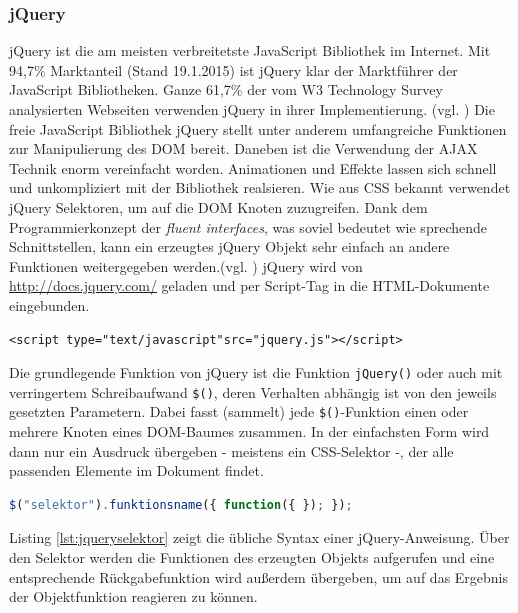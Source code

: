 \subsubsection{jQuery}
jQuery ist die am meisten verbreitetste JavaScript Bibliothek im Internet. Mit 94,7\% Marktanteil (Stand 19.1.2015) ist jQuery klar der Marktführer der JavaScript Bibliotheken. Ganze 61,7\% der vom W3 Technology Survey analysierten Webseiten verwenden jQuery in ihrer Implementierung. (vgl. \cite{w3tech}) Die freie JavaScript Bibliothek jQuery stellt unter anderem umfangreiche Funktionen zur Manipulierung des DOM bereit. Daneben ist die Verwendung der AJAX Technik enorm vereinfacht worden. Animationen und Effekte lassen sich schnell und unkompliziert mit der Bibliothek realsieren. Wie aus CSS bekannt verwendet jQuery Selektoren, um auf die DOM Knoten zuzugreifen. Dank dem Programmierkonzept der \textit{fluent interfaces}, was soviel bedeutet wie sprechende Schnittstellen, kann ein erzeugtes jQuery Objekt sehr einfach an andere Funktionen weitergegeben werden.(vgl. \cite{wikijquery}) \glqq jQuery wird von \url{http://docs.jquery.com/} geladen und per Script-Tag in die HTML-Dokumente eingebunden.

\vspace{1em}
\begin{lstlisting}[language=HTML5, caption=jQuery Einbindung, label=lst:jqueryscript]
<script type="text/javascript"src="jquery.js"></script>
\end{lstlisting}

Die grundlegende Funktion von jQuery ist die Funktion \texttt{jQuery()} oder auch mit verringertem Schreibaufwand \texttt{\$()}, deren Verhalten abhängig ist von den jeweils gesetzten Parametern. Dabei fasst (sammelt) jede \texttt{\$()}-Funktion einen oder mehrere Knoten eines DOM-Baumes zusammen. In der einfachsten Form wird dann nur ein Ausdruck übergeben - meistens ein CSS-Selektor -, der alle passenden Elemente im Dokument findet.\grqq{}\cite{itwissenjquery}

\vspace{1em}
\begin{lstlisting}[language=JavaScript, caption=jQuery Selektor Syntax, label=lst:jqueryselektor]
$("selektor").funktionsname({ function({ }); });
\end{lstlisting}
	
Listing \ref{lst:jqueryselektor} zeigt die übliche Syntax einer jQuery-Anweisung. Über den Selektor werden die Funktionen des erzeugten Objekts aufgerufen und eine entsprechende Rückgabefunktion wird außerdem übergeben, um auf das Ergebnis der Objektfunktion reagieren zu können.

